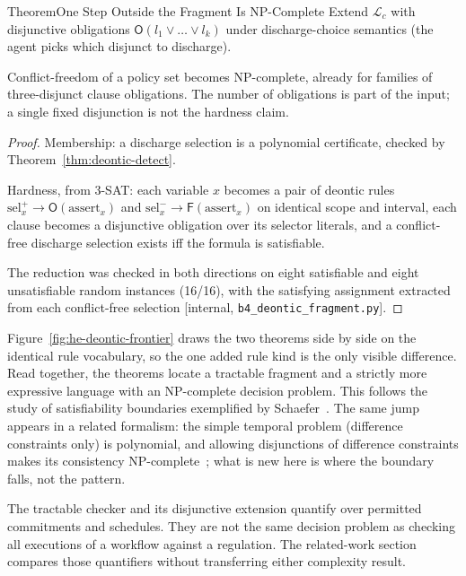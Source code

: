 \documentclass[11pt,a4paper]{article}
\theoremstyle{definition}
\theoremstyle{definition}
\theoremstyle{remark}
\begin{document}
\begin{pdclaim}{Theorem}{One Step Outside the Fragment Is NP-Complete}
\setlength{\parskip}{4pt plus 1pt}
\label{thm:deontic-frontier}
Extend $\mathcal{L}_c$ with disjunctive obligations
$\mathsf{O}(l_1\vee\dots\vee l_k)$ under discharge-choice semantics (the agent
picks which disjunct to discharge).

Conflict-freedom of a policy set becomes
NP-complete, already for families of three-disjunct clause obligations.
The number of obligations is part of the input; a single fixed disjunction
is not the hardness claim.
\end{pdclaim}
\begin{proof}
\setlength{\parskip}{4pt plus 1pt}
Membership: a discharge selection is a polynomial certificate, checked by
Theorem~\ref{thm:deontic-detect}.

Hardness, from 3-SAT: each variable $x$
becomes a pair of deontic rules $\mathrm{sel}^{+}_x\to\mathsf{O}(\mathrm{assert}_x)$
and $\mathrm{sel}^{-}_x\to\mathsf{F}(\mathrm{assert}_x)$ on identical scope and
interval, each clause becomes a disjunctive obligation over its selector
literals, and a conflict-free discharge selection exists iff the formula is
satisfiable.

The reduction was checked in both directions on eight satisfiable
and eight unsatisfiable random instances (16/16), with the satisfying
assignment extracted from each conflict-free selection [internal,
\texttt{b4\_deontic\_fragment.py}].
\end{proof}



Figure~\ref{fig:he-deontic-frontier} draws the two theorems side by side on
the identical rule vocabulary, so the one added rule kind is the only visible
difference. Read together, the theorems locate a tractable fragment and a strictly more
expressive language with an NP-complete decision problem. This follows the
study of satisfiability boundaries exemplified by Schaefer~.
The same
jump appears in a related formalism: the simple temporal problem (difference
constraints only) is polynomial, and allowing disjunctions of difference
constraints makes its consistency NP-complete~; what is new here is where the
boundary falls, not the pattern.

\pagebreak[4]
The tractable checker and its disjunctive extension quantify over permitted
commitments and schedules. They are not the same decision problem as checking
all executions of a workflow against a regulation. The related-work section
compares those quantifiers without transferring either complexity result.
\end{document}
